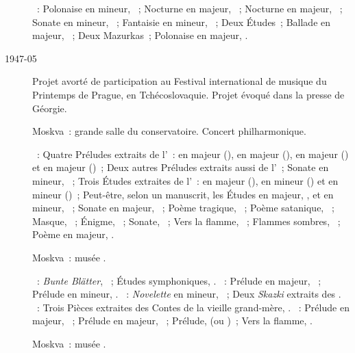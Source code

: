 \begin{description}
 \textsc{\Chopin{}}~: Polonaise en \kC \Sharp mineur,  ~;
 Nocturne en \kF \Sharp majeur,  ~; Nocturne en \kF
 majeur,  ~; Sonate en \kB \Flat mineur, ~;
 Fantaisie en \kF mineur, ~; Deux Études~; Ballade en \kA \Flat
 majeur, ~; Deux Mazurkas~; Polonaise en \kA \Flat majeur,
 .
 \item[1947-05]
 Projet avorté de participation au Festival international de musique du
 Printemps de Prague, en Tchécoslovaquie.
 Projet évoqué dans la presse de Géorgie.
 \item[\DateWithWeekDay{1947-05-15}]
 Moskva~: grande salle du conservatoire.
 Concert philharmonique.

 \textsc{\Scriabine{}}~: Quatre Préludes extraits de l'~: en \kB
 majeur (), en \kG \Flat majeur (), en \kD \Flat
 majeur () et en \kA \Flat majeur ()~; Deux autres
 Préludes extraits aussi de l'~; Sonate en \kF \Sharp mineur,
 ~; Trois Études extraites de l'~: en \kB majeur
 (), en \kB \Flat mineur () et en \kG \Sharp mineur
 ()~; Peut-être, selon un manuscrit, les Études en \kA \Flat
 majeur,  , et en \kD \Sharp mineur, 
 ~; Sonate en \kF \Sharp majeur, ~; Poème tragique,
 ~; Poème satanique, ~; Masque,  ~;
 Énigme,  ~; Sonate, ~; Vers la flamme,
 ~; Flammes sombres,  ~; Poème en \kF \Sharp
 majeur,  .
 \item[\DateWithWeekDay{1947-06-18}]
 Moskva~: musée \Scriabine{}.

 \textsc{\Schumann{}}~: \emph{Bunte Blätter}, ~; Études
 symphoniques, .
 \textsc{\Rachmaninov{}}~: Prélude en \kD majeur,  ~;
 Prélude en \kC mineur,  .
 \textsc{\Medtner{}}~: \emph{Novelette} en \kC mineur, 
 ~; Deux \emph{Skazki} extraits des .
 \textsc{\Prokofiev{}}~: Trois Pièces extraites des Contes de la vieille
 grand-mère, .
 \textsc{\Scriabine{}}~: Prélude en \kF \Sharp majeur, 
 ~; Prélude en \kF \Sharp majeur,  ~; Prélude,
   (ou )~; Vers la flamme, .
 \item[\DateWithWeekDay{1947-07-10}]
 Moskva~: musée \Scriabine{}.


\end{description}
